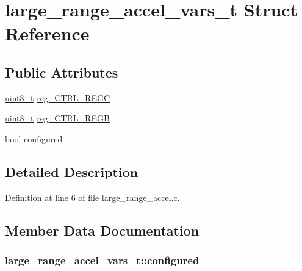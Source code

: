 \hypertarget{structlarge__range__accel__vars__t}{}\section{large\+\_\+range\+\_\+accel\+\_\+vars\+\_\+t Struct Reference}
\label{structlarge__range__accel__vars__t}
\subsection*{Public Attributes}
\begin{DoxyCompactItemize}
\item 
\hyperlink{_p_e___types_8h_aba7bc1797add20fe3efdf37ced1182c5}{uint8\+\_\+t} \hyperlink{structlarge__range__accel__vars__t_a8a5530548c1aa4aff744bf6bffc578f1}{reg\+\_\+\+C\+T\+R\+L\+\_\+\+R\+E\+GC}
\item 
\hyperlink{_p_e___types_8h_aba7bc1797add20fe3efdf37ced1182c5}{uint8\+\_\+t} \hyperlink{structlarge__range__accel__vars__t_a2f25a5e28f3832ea74322e3d0853ace6}{reg\+\_\+\+C\+T\+R\+L\+\_\+\+R\+E\+GB}
\item 
\hyperlink{_p_e___types_8h_a97a80ca1602ebf2303258971a2c938e2}{bool} \hyperlink{structlarge__range__accel__vars__t_a8e6386af70055fb261447b78cf3c5dd3}{configured}
\end{DoxyCompactItemize}


\subsection{Detailed Description}


Definition at line 6 of file large\+\_\+range\+\_\+accel.\+c.



\subsection{Member Data Documentation}
\subsubsection[{\texorpdfstring{configured}{configured}}]{ large\+\_\+range\+\_\+accel\+\_\+vars\+\_\+t\+::configured}\hypertarget{structlarge__range__accel__vars__t_a8e6386af70055fb261447b78cf3c5dd3}{}\label{structlarge__range__accel__vars__t_a8e6386af70055fb261447b78cf3c5dd3}


